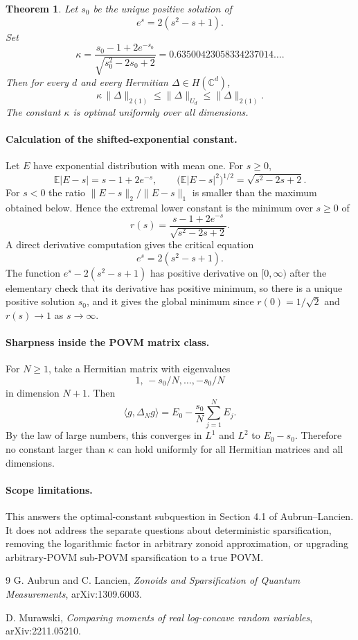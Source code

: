 \documentclass[11pt]{article}
\newtheorem*{theorem*}{Theorem}
\begin{document}
\begin{theorem*}
Let $s_0$ be the unique positive solution of
\[
  e^s=2(s^2-s+1).
\]
Set
\[
  \kappa
  =
  \frac{s_0-1+2e^{-s_0}}{\sqrt{s_0^2-2s_0+2}}
  =
  0.63500423058334237014\ldots .
\]
Then for every $d$ and every Hermitian $\Delta\in H(\mathbb C^d)$,
\[
  \kappa\,\|\Delta\|_{2(1)}
  \leq
  \|\Delta\|_{U_d}
  \leq
  \|\Delta\|_{2(1)}.
\]
The constant $\kappa$ is optimal uniformly over all dimensions.
\end{theorem*}

\paragraph{Calculation of the shifted-exponential constant.}
Let $E$ have exponential distribution with mean one. For $s\geq0$,
\[
  \mathbb E|E-s|=s-1+2e^{-s},
  \qquad
  \big(\mathbb E|E-s|^2\big)^{1/2}=\sqrt{s^2-2s+2}.
\]
For $s<0$ the ratio $\|E-s\|_2/\|E-s\|_1$ is smaller than the maximum obtained
below. Hence the extremal lower constant is the minimum over $s\geq0$ of
\[
  r(s)=\frac{s-1+2e^{-s}}{\sqrt{s^2-2s+2}}.
\]
A direct derivative computation gives the critical equation
\[
  e^s=2(s^2-s+1).
\]
The function $e^s-2(s^2-s+1)$ has positive derivative on $[0,\infty)$ after
the elementary check that its derivative has positive minimum, so there is a
unique positive solution $s_0$, and it gives the global minimum since
$r(0)=1/\sqrt2$ and $r(s)\to1$ as $s\to\infty$.

\paragraph{Sharpness inside the POVM matrix class.}
For $N\geq1$, take a Hermitian matrix with eigenvalues
\[
  1,\,-s_0/N,\ldots,-s_0/N
\]
in dimension $N+1$. Then
\[
  \langle g,\Delta_N g\rangle
  =
  E_0-\frac{s_0}{N}\sum_{j=1}^N E_j.
\]
By the law of large numbers, this converges in $L^1$ and $L^2$ to $E_0-s_0$.
Therefore no constant larger than $\kappa$ can hold uniformly for all
Hermitian matrices and all dimensions.

\paragraph{Scope limitations.}
This answers the optimal-constant subquestion in Section 4.1 of
Aubrun--Lancien. It does not address the separate questions about deterministic
sparsification, removing the logarithmic factor in arbitrary zonoid
approximation, or upgrading arbitrary-POVM sub-POVM sparsification to a true
POVM.

\begin{thebibliography}{9}
G. Aubrun and C. Lancien,
\emph{Zonoids and Sparsification of Quantum Measurements},
arXiv:1309.6003.

D. Murawski,
\emph{Comparing moments of real log-concave random variables},
arXiv:2211.05210.
\end{thebibliography}
\end{document}
